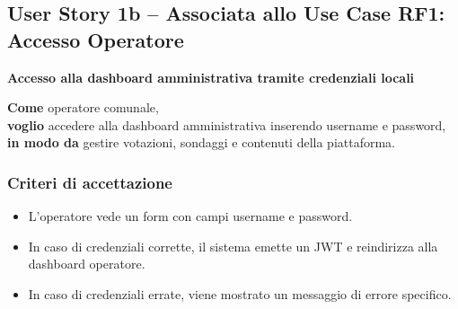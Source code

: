\documentclass{article}
\begin{document}

\subsection{User Story 1b -- Associata allo Use Case RF1: Accesso Operatore}

\textbf{Accesso alla dashboard amministrativa tramite credenziali locali}

\textbf{Come} operatore comunale,\\
\textbf{voglio} accedere alla dashboard amministrativa inserendo username e password,\\
\textbf{in modo da} gestire votazioni, sondaggi e contenuti della piattaforma.

\subsubsection{Criteri di accettazione}
\begin{itemize}
    \item L'operatore vede un form con campi username e password.
    \item In caso di credenziali corrette, il sistema emette un JWT e reindirizza alla dashboard operatore.
    \item In caso di credenziali errate, viene mostrato un messaggio di errore specifico.
\end{itemize}
\end{document}
